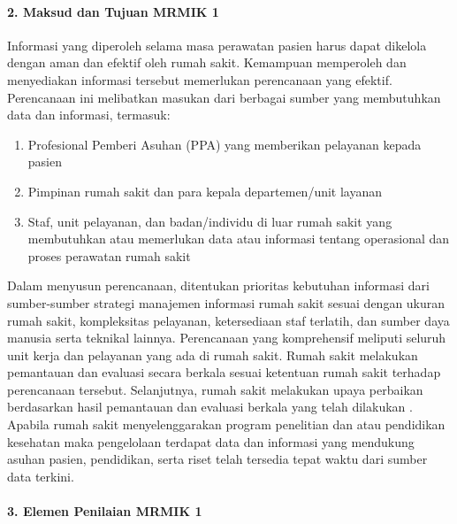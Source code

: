 \documentclass[
]{book}
\providecommand{\tightlist}{%
  \setlength{\itemsep}{0pt}\setlength{\parskip}{0pt}}
\begin{document}
\hypertarget{maksud-dan-tujuan-mrmik-1}{%
\paragraph*{2. Maksud dan Tujuan MRMIK 1}\label{maksud-dan-tujuan-mrmik-1}}

Informasi yang diperoleh selama masa perawatan pasien harus dapat dikelola dengan aman dan efektif oleh rumah sakit. Kemampuan memperoleh dan menyediakan informasi tersebut memerlukan perencanaan yang efektif. Perencanaan ini melibatkan masukan dari berbagai sumber yang membutuhkan data dan informasi, termasuk:

\begin{enumerate}
\def\labelenumi{\alph{enumi}.}
\tightlist
\item
  Profesional Pemberi Asuhan (PPA) yang memberikan pelayanan kepada pasien
\item
  Pimpinan rumah sakit dan para kepala departemen/unit layanan
\item
  Staf, unit pelayanan, dan badan/individu di luar rumah sakit yang membutuhkan atau memerlukan data atau informasi tentang operasional dan proses perawatan rumah sakit
\end{enumerate}

Dalam menyusun perencanaan, ditentukan prioritas kebutuhan informasi dari sumber-sumber strategi manajemen informasi rumah sakit sesuai dengan ukuran rumah sakit, kompleksitas pelayanan, ketersediaan staf terlatih, dan sumber daya manusia serta teknikal lainnya. Perencanaan yang komprehensif meliputi seluruh unit kerja dan pelayanan yang ada di rumah sakit.
Rumah sakit melakukan pemantauan dan evaluasi secara berkala sesuai ketentuan rumah sakit terhadap perencanaan tersebut. Selanjutnya, rumah sakit melakukan upaya perbaikan berdasarkan hasil pemantauan dan evaluasi berkala yang telah dilakukan .
Apabila rumah sakit menyelenggarakan program penelitian dan atau pendidikan kesehatan maka pengelolaan terdapat data dan informasi yang mendukung asuhan pasien, pendidikan, serta riset telah tersedia tepat waktu dari sumber data terkini.

\hypertarget{elemen-penilaian-mrmik-1}{%
\paragraph*{3. Elemen Penilaian MRMIK 1}\label{elemen-penilaian-mrmik-1}}
\end{document}
